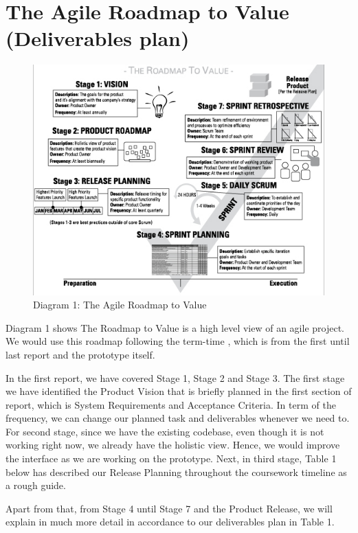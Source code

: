 \documentclass[12pt]{article}
\begin{document}
	\section{The Agile Roadmap to Value (Deliverables plan)}
		\begin{figure}[htbp]
			\centerline{\includegraphics{roadmaptovalue.jpg}}
				\caption{Diagram 1: The Agile Roadmap to Value \cite{agileRoadmapToValue}}
		\end{figure}
		
		Diagram 1 shows The Roadmap to Value is a high level view of an agile project. We would use this roadmap following the term-time , which is from the first until last report and the prototype itself.
		
		In the first report, we have covered Stage 1, Stage 2 and Stage 3. The first stage we have identified the Product Vision that is briefly planned in the first section of report, which is System Requirements and Acceptance Criteria. In term of the frequency, we can change our planned task and deliverables whenever we need to. For second stage, since we have the existing codebase, even though it is not working right now, we already have the holistic view. Hence, we would improve the interface as we are working on the prototype. Next, in third stage, Table 1 below has described our Release Planning throughout the coursework timeline as a rough guide. 
		
		Apart from that, from Stage 4 until Stage 7 and the Product Release, we will explain in much more detail in accordance to our deliverables plan in Table 1.
		
\end{document}

